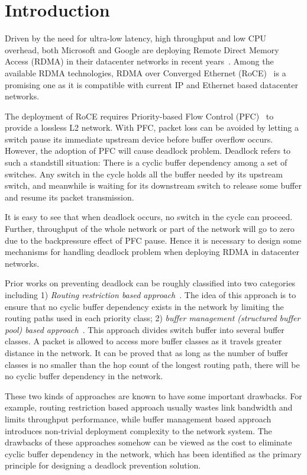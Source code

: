 \section{Introduction}\label{sec:intro}

Driven by the need for ultra-low latency, high throughput and low CPU overhead, both Microsoft and Google are deploying Remote Direct Memory Access (RDMA) in their datacenter networks in recent years~\cite{dcqcn,timely}. Among the available RDMA technologies,  RDMA over Converged Ethernet (RoCE)~\cite{roce} is a promising one as it is compatible with current IP and Ethernet based datacenter networks.

The deployment of RoCE requires Priority-based Flow Control (PFC)~\cite{pfc} to provide a lossless L2 network. With PFC, packet loss can be avoided by letting a switch pause its immediate upstream device before buffer overflow occurs. However, the adoption of PFC will cause deadlock problem. Deadlock refers to such a standstill situation: There is a cyclic buffer dependency among a set of switches. Any switch in the cycle holds all the buffer needed by its upstream switch, and meanwhile is waiting for its downstream switch to release some buffer and resume its packet transmission.

It is easy to see that when deadlock occurs, no switch in the cycle can proceed. Further, throughput of the whole network or part of the network will go to zero due to the backpressure effect of PFC pause. Hence it is necessary to design some mechanisms for handling deadlock problem when deploying RDMA in datacenter networks. 

Prior works on preventing deadlock can be roughly classified into two categories including 1) \textit{Routing restriction based approach}~\cite{tcpbolt,flich2012survey}. The idea of this approach is to ensure that no cyclic buffer dependency exists in the network by limiting the routing paths used in each priority class;  2) \textit{buffer management (structured buffer pool) based approach}~\cite{gerla1980flow,karol2003prevention}. This approach divides switch buffer into several buffer classes. A packet is allowed to access more buffer classes as it travels greater distance in the network. It can be proved that as long as the number of buffer classes is no smaller than the hop count of the longest routing path, there will be no cyclic buffer dependency in the network.


These two kinds of approaches are known to have some important drawbacks. For example, routing restriction based approach usually wastes link bandwidth and limits throughput performance, while buffer management based approach introduces non-trivial deployment complexity to the network system. The drawbacks of these approaches somehow can be viewed as the cost to eliminate cyclic buffer dependency in the network, which has been identified as the primary principle for designing a deadlock prevention solution.


